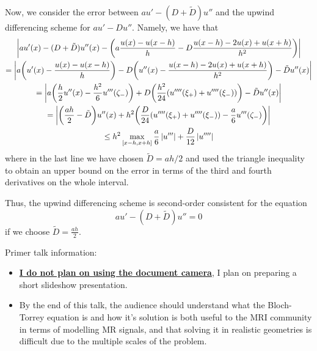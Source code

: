 \begin{problem}{1}
\begin{solution}
Now, we consider the error between $au'-(D+\tilde{D})u''$
and the upwind differencing scheme for $au' - Du''$.
Namely, we have that
\begin{gather*}
    \left|  au'(x)-(D+\tilde{D})u''(x) -
    \bigg( a\frac{u(x)-u(x-h)}{h} -
    D\frac{u(x-h) - 2u(x) + u(x+h)}{h^2} \bigg)  \right| \\
    = \left|  a\bigg(u'(x) - \frac{u(x)-u(x-h)}{h}\bigg) -
    D\bigg( u''(x) - \frac{u(x-h) - 2u(x) + u(x+h)}{h^2} \bigg) -
    \tilde{D}u''(x)  \right| \\
    = \left|  a \bigg( \frac{h}{2}u''(x) - \frac{h^2}{6}u'''(\zeta_-) 
    \bigg) +
    D \bigg( \frac{h^2}{24} (u''''(\xi_+) + u''''(\xi_-)) \bigg) -
    \tilde{D} u''(x)  \right| \\
    = \left|  \bigg( \frac{ah}{2} - \tilde{D} \bigg)u''(x) +
    h^2 \bigg( \frac{D}{24}(u''''(\xi_+) + u''''(\xi_-)) -
    \frac{a}{6}u'''(\zeta_-) \bigg)  \right| \\
    \leq h^2 \max_{[x-h,x+h]} \frac{a}{6}\left| u''' \right| + 
    \frac{D}{12}\left| u'''' \right|
\end{gather*}
where in the last line we have chosen $\tilde{D}=ah/2$ and used
the triangle inequality to obtain an upper bound on the error in terms
of the third and fourth derivatives on the whole interval.

Thus, the upwind differencing scheme is second-order consistent
for the equation $$au' - (D+\tilde{D})u''=0$$ if we choose
$\boxed{\tilde{D} = \frac{ah}{2}}$.

\end{solution}
\pagebreak

\end{problem} %
\pagebreak

\begin{afterword}{}
Primer talk information:
\begin{itemize}
    \item \textbf{\underline{I do not plan on using the 
    document camera}}, I plan on preparing a short slideshow
    presentation.
    \item By the end of this talk, the audience should understand
    what the Bloch-Torrey equation is and how it's solution is both
    useful to the MRI community in terms of modelling MR signals,
    and that solving it in realistic geometries is difficult due to
    the multiple scales of the problem.
\end{itemize}
\end{afterword}
\vspace{1cm}

